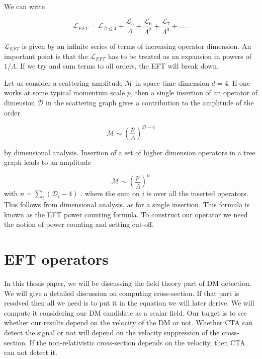 \documentclass[12pt]{report}
\begin{document}
We can write \cite{eft1} \cite{eft2}

$$\mathscr{L}_{EFT}=\mathscr{L}_{\mathscr{D}\leq 4}+\frac{\mathscr{L}_5}{\Lambda}+\frac{\mathscr{L}_6}{\Lambda^2}+\frac{\mathscr{L}_7}{\Lambda^3}+.....$$

$\mathscr{L}_{EFT}$ is given by an infinite series of terms of increasing operator dimension. An important point is that the $\mathscr{L}_{EFT}$ has to be treated as an expansion in powers of $1/\Lambda$.
If we try and sum terms to all orders, the EFT will break down.

 Let us consider a scattering amplitude $\mathcal{M}$
in space-time dimension $d=4$. If one works at some typical momentum scale $p$, then a single insertion of an operator of dimension $\mathscr{D}$ in the scattering graph gives a contribution to the amplitude of the order

$$\mathcal{M} \sim \left(\frac{p}{\Lambda} \right)^{\mathscr{D}-4}$$

by dimensional analysis. Insertion of a set
of higher dimension operators in a tree graph leads to an amplitude

$$\mathcal{M} \sim \left(\frac{p}{\Lambda} \right)^n$$
 with $n=\sum_i (\mathscr{D}_i - 4)$ . where the sum on $i$ is over all the inserted operators. This follows from dimensional analysis, as for a single insertion. This formula is known as the EFT power counting formula.
 To construct our operator we need the notion of power counting and setting cut-off.


\section{EFT operators}
In this thesis paper, we will be discussing the field theory part of DM detection. We will give a detailed discussion on computing cross-section. If that part is resolved then all we need is to put it in the equation we will later derive. We will compute it considering our DM candidate as a scalar field. Our target is to see whether our results depend on the velocity of the DM or not. Whether CTA can detect the signal or not will depend on the velocity suppression of the cross-section. If the non-relativistic cross-section depends on the velocity, then CTA can not detect it.\\
\end{document}
